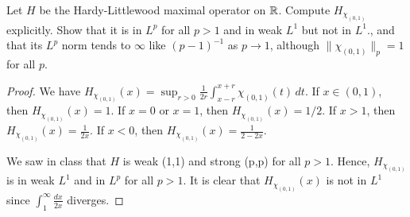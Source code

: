 \documentclass{article}
\begin{document}
 Let $H$ be the Hardy-Littlewood maximal operator on $\mathbb{R}$. Compute $H_{\chi_{(0,1)}}$ explicitly. 
Show that it is in $L^p$ for all $p > 1$ and in weak $L^1$ but not in $L^1$., and that its $L^p$ norm tends to $\infty$ 
like $(p-1)^{-1}$ as $p \to 1$, although $\|\chi_{(0,1)}\|_p = 1$ for all $p$.
\begin{proof}
We have $H_{\chi_{(0,1)}}(x) = \sup_{r>0} \frac 1 {2 r} \int_{x-r}^{x+r} \chi_{(0,1)}(t) \, dt$. If $x \in (0,1)$, then $H_{\chi_{(0,1)}}(x) = 1$.  If $x=0$ or $x =1$, then $H_{\chi_{(0,1)}}(x) = 1/2$.  If $x > 1$, then $H_{\chi_{(0,1)}}(x) = \frac 1 {2x}$.  If $x < 0$, then $H_{\chi_{(0,1)}}(x) = \frac 1 {2-2x}$.

We saw in class that $H$ is weak (1,1) and strong (p,p) for all $p > 1$. Hence, $H_{\chi_{(0,1)}}$ is in weak $L^1$ and in $L^p$ for all $p > 1$. It is clear that $H_{\chi_{(0,1)}}(x)$ is not in $L^1$ since $\int_1^\infty \frac {dx}{2x}$ diverges.






\end{proof}
\end{document}
